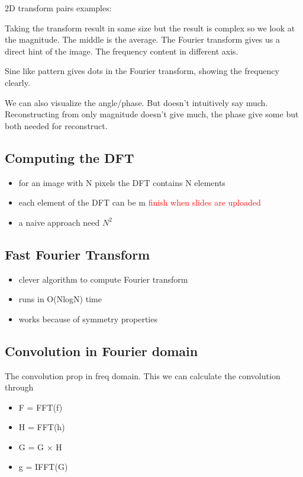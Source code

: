 2D transform pairs examples: 

Taking the transform result in same size but the result is complex so we look at the magnitude. The middle is the average. The Fourier transform gives us a direct hint of the image. The frequency content in different axis.

Sine like pattern gives dots in the Fourier transform, showing the frequency clearly. 

We can also visualize the angle/phase. But doesn't intuitively say much. Reconstructing from only magnitude doesn't give much, the phase give some but both needed for reconstruct. 

\subsection*{Computing the DFT}
\begin{itemize}
	\item for an image with N pixels the DFT contains N elements
	\item each element of the DFT can be m \textcolor{red}{finish when slides are uploaded} 
	\item a naive approach need $N^{2}$
\end{itemize}


\subsection*{Fast Fourier Transform }
\begin{itemize}
	\item clever algorithm to compute Fourier transform
	\item runs in O(NlogN) time
	\item works because of symmetry properties
\end{itemize}

\subsection*{Convolution in Fourier domain}
The convolution prop in freq domain. This we can calculate the convolution through

\begin{itemize}
	\item F = FFT(f)
	\item H = FFT(h)
	\item G = G $\times$ H
	\item g = IFFT(G)
\end{itemize}


